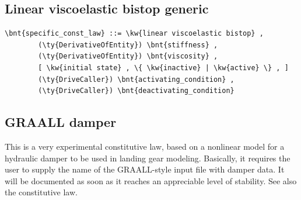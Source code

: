 \subsection{Linear viscoelastic bistop generic}
\begin{Verbatim}[commandchars=\\\{\}]
    \bnt{specific_const_law} ::= \kw{linear viscoelastic bistop} ,
        (\ty{DerivativeOfEntity}) \bnt{stiffness} ,
        (\ty{DerivativeOfEntity}) \bnt{viscosity} ,
        [ \kw{initial state} , \{ \kw{inactive} | \kw{active} \} , ]
        (\ty{DriveCaller}) \bnt{activating_condition} ,
        (\ty{DriveCaller}) \bnt{deactivating_condition}
\end{Verbatim}
  
\subsection{GRAALL damper}
This is a very experimental constitutive law, based on a nonlinear model
for a hydraulic damper to be used in landing gear modeling.
Basically, it requires the user to supply the name of the GRAALL-style 
input file with damper data.
It will be documented as soon as it reaches an appreciable level of
stability.
See also the 
constitutive law.


